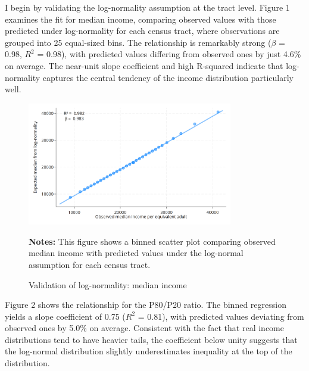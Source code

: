 
I begin by validating the log-normality assumption at the tract level. Figure 1 examines the fit for median income, comparing observed values with those predicted under log-normality for each census tract, where observations are grouped into 25 equal-sized bins. The relationship is remarkably strong ($\beta$ = 0.98, $R^2$ = 0.98), with predicted values differing from observed ones by just 4.6\% on average. The near-unit slope coefficient and high R-squared indicate that log-normality captures the central tendency of the income distribution particularly well.

\begin{figure}[H]
\begin{center}
\captionsetup{justification=centering}
\caption{Validation of log-normality: median income}
\label{fig:median}
\includegraphics[width=0.8\textwidth]{output/binned_scatter_median.png}
\end{center}
\begin{fignotes2}
\textbf{Notes:} This figure shows a binned scatter plot comparing observed median income with predicted values under the log-normal assumption for each census tract. 
\end{fignotes2}
\end{figure}

Figure 2 shows the relationship for the P80/P20 ratio. The binned regression yields a slope coefficient of 0.75 ($R^2$ = 0.81), with predicted values deviating from observed ones by 5.0\% on average. Consistent with the fact that real income distributions tend to have heavier tails, the coefficient below unity suggests that the log-normal distribution slightly underestimates inequality at the top of the distribution.

